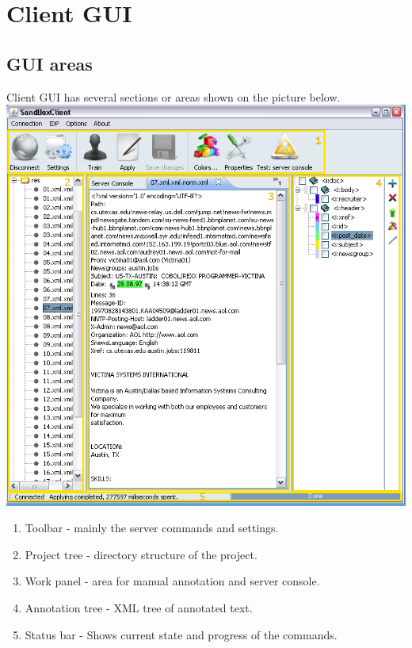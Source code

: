 \documentclass[12pt]{article}
\begin{document}
\section{Client GUI}

\subsection{GUI areas}
Client GUI has several sections or areas shown on the picture below.\\
\includegraphics[scale=0.6]{00ClientAreas.png}
\begin{enumerate}
        \item Toolbar - mainly the server commands and settings.
	\item Project tree - directory structure of the project.
	\item Work panel - area for manual annotation and server console.
	\item Annotation tree - XML tree of annotated text.
	\item Status bar - Shows current state and progress of the commands.
\end{enumerate}
\end{document}
